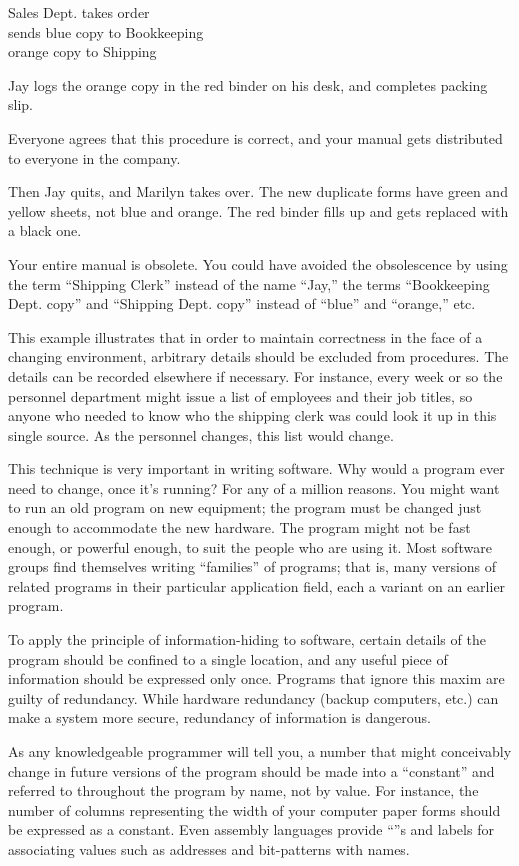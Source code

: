 \begin{tfquot}
Sales Dept. takes order\\
sends blue copy to Bookkeeping\\
orange copy to Shipping

Jay logs the orange copy in the red binder on his desk, and completes
packing slip.
\end{tfquot}
Everyone agrees that this procedure is correct, and your manual gets
distributed to everyone in the company.

Then Jay quits, and Marilyn takes over. The new duplicate forms have
green and yellow sheets, not blue and orange. The red binder fills up
and gets replaced with a black one.

Your entire manual is obsolete. You could have avoided the
obsolescence by using the term ``Shipping Clerk'' instead of the name
``Jay,'' the terms ``Bookkeeping Dept. copy'' and ``Shipping Dept.  copy''
instead of ``blue'' and ``orange,'' etc.

This example illustrates that in order to maintain correctness in the
face of a changing environment, arbitrary details should be excluded
from procedures. The details can be recorded elsewhere if necessary.
For instance, every week or so the personnel department might issue a
list of employees and their job titles, so anyone who needed to know
who the shipping clerk was could look it up in this single source.  As
the personnel changes, this list would change.

This technique is very important in writing software. Why would a
program ever need to change, once it's running? For any of a million
reasons. You might want to run an old program on new equipment; the
program must be changed just enough to accommodate the new hardware.
The program might not be fast enough, or powerful enough, to suit the
people who are using it. Most software groups find themselves writing
``families'' of programs; that is, many versions of related programs
in their particular application field, each a variant on an earlier
program. 

To apply the principle of information-hiding to software, certain
details of the program should be confined to a single location, and
any useful piece of information should be expressed only once.
Programs that ignore this maxim are guilty of redundancy. While
hardware redundancy (backup computers, etc.) can make a system more
secure, redundancy of information is dangerous.

As any knowledgeable programmer will tell you, a number that might
conceivably change in future versions of the program should be made
into a ``constant'' and referred to throughout the program by name,
not by value. For instance, the number of columns representing the
width of your computer paper forms should be expressed as a
constant. Even assembly languages provide ``''s and labels
for associating values such as addresses and bit-patterns with names.

